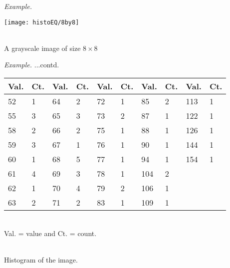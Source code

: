 \documentclass{response}
\begin{document}
{{\huge \em Example.}

\begin{center}
\texttt{[image: histoEQ/8by8]}
\end{center}
\mbox{}\\
A grayscale image of size $8\times 8$


\newpage

\bigskip

{\huge \em Example.} ...contd.
\begin{center}
\renewcommand{\tabcolsep}{0.1em}
\begin{tabular}{|l|l| l|l| l|l| l|l| l|l|}
\hline
Val. & Ct.	& Val. & Ct. & Val. & Ct. &	Val. & Ct. & Val. & Ct.\\ \hline \hline
52	& 1	& 64	& 2	& 72	& 1	& 85	& 2	& 113	& 1 \\ \hline
55	& 3	& 65	& 3	& 73	& 2	& 87	& 1	& 122	& 1\\ \hline
58	& 2	& 66	& 2	& 75	& 1	& 88	& 1	& 126	& 1\\ \hline
59	& 3	& 67	& 1	& 76	& 1	& 90	& 1	& 144	& 1\\ \hline
60	& 1	& 68	& 5	& 77	& 1	& 94	& 1	& 154	& 1\\ \hline
61	& 4	& 69	& 3	& 78	& 1	& 104	& 2	& &\\ \hline
62	& 1	& 70	& 4	& 79	& 2	& 106	& 1 & &\\ \hline
63	& 2	& 71	& 2	& 83	& 1	& 109	& 1 & &\\ \hline
\end{tabular}
\end{center}
\mbox{}\\
Val. = value and Ct. = count.

\mbox{}\\[10pt]
Histogram of the image.



\newpage

\bigskip

}
\end{document}
